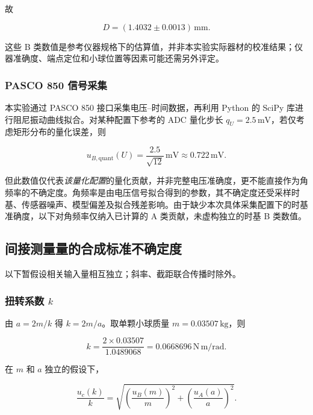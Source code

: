 \documentclass[UTF8]{ctexart}
\begin{document}
故

\begin{equation}
 D=(1.4032\pm0.0013)\,\mathrm{mm}.
\end{equation}

这些 B 类数值是参考仪器规格下的估算值，并非本实验实际器材的校准结果；仪器准确度、端点定位和小球位置等因素可能还需另外评定。

\subsubsection{PASCO 850 信号采集}

本实验通过 PASCO 850 接口采集电压--时间数据，再利用 Python 的 SciPy 库进行阻尼振动曲线拟合。对某种配置下参考的 ADC 量化步长 $q_U=2.5\,\mathrm{mV}$，若仅考虑矩形分布的量化误差，则

\begin{equation}
 u_{B,\mathrm{quant}}(U)=\frac{2.5}{\sqrt{12}}\,\mathrm{mV}
 \approx0.722\,\mathrm{mV}.
\end{equation}

但此数值仅代表\emph{该量化配置}的量化贡献，并非完整电压准确度，更不能直接作为角频率的不确定度。角频率是由电压信号拟合得到的参数，其不确定度还受采样时基、传感器噪声、模型偏差及拟合残差影响。由于缺少本次具体采集配置下的时基准确度，以下对角频率仅纳入已计算的 A 类贡献，未虚构独立的时基 B 类数值。


\subsection{间接测量量的合成标准不确定度}
以下暂假设相关输入量相互独立；斜率、截距联合传播时除外。

\subsubsection{扭转系数 $k$}

由 $a=2m/k$ 得 $k=2m/a$。取单颗小球质量 $m=0.03507\,\mathrm{kg}$，则

\begin{equation}
 k=\frac{2\times0.03507}{1.0489068}
 =0.0668696\,\mathrm{N\,m/rad}.
\end{equation}

在 $m$ 和 $a$ 独立的假设下，

\begin{equation}
 \frac{u_c(k)}{k}=\sqrt{\left(\frac{u_B(m)}m\right)^2+
 \left(\frac{u_A(a)}a\right)^2}.
\end{equation}
\end{document}
